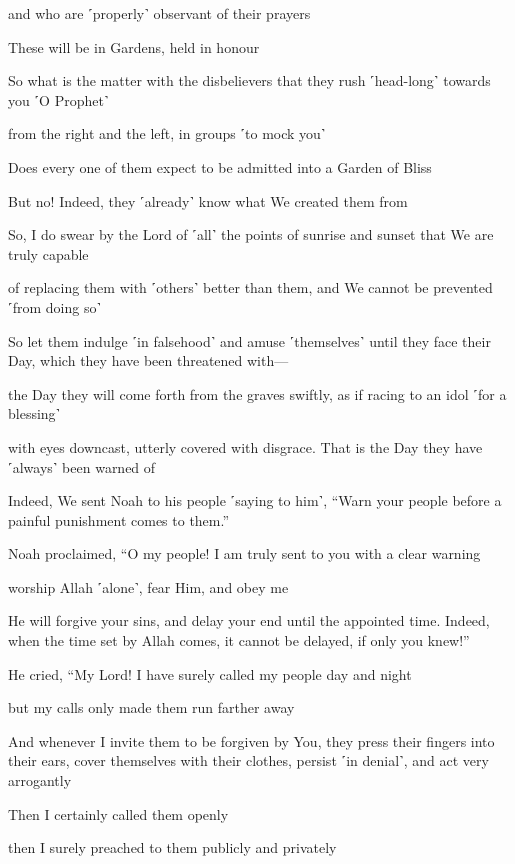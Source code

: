 and who are ˹properly˺ observant of their prayers

These will be in Gardens, held in honour

So what is the matter with the disbelievers that they rush ˹head-long˺ towards you ˹O Prophet˺

from the right and the left, in groups ˹to mock you˺

Does every one of them expect to be admitted into a Garden of Bliss

But no! Indeed, they ˹already˺ know what We created them from

So, I do swear by the Lord of ˹all˺ the points of sunrise and sunset that We are truly capable

of replacing them with ˹others˺ better than them, and We cannot be prevented ˹from doing so˺

So let them indulge ˹in falsehood˺ and amuse ˹themselves˺ until they face their Day, which they have been threatened with—

the Day they will come forth from the graves swiftly, as if racing to an idol ˹for a blessing˺

with eyes downcast, utterly covered with disgrace. That is the Day they have ˹always˺ been warned of

Indeed, We sent Noah to his people ˹saying to him˺, “Warn your people before a painful punishment comes to them.”

Noah proclaimed, “O my people! I am truly sent to you with a clear warning

worship Allah ˹alone˺, fear Him, and obey me

He will forgive your sins, and delay your end until the appointed time. Indeed, when the time set by Allah comes, it cannot be delayed, if only you knew!”

He cried, “My Lord! I have surely called my people day and night

but my calls only made them run farther away

And whenever I invite them to be forgiven by You, they press their fingers into their ears, cover themselves with their clothes, persist ˹in denial˺, and act very arrogantly

Then I certainly called them openly

then I surely preached to them publicly and privately

